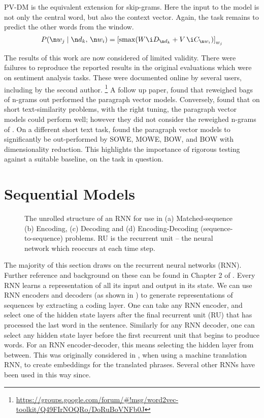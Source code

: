 {PV-DM is the equivalent extension for skip-grams.
Here the input to the model is not only the central word, but also the context vector.
Again, the task remains to predict the other words from the window.
\begin{equation}
P(\n w_j \mid \n d_k,\, \n w_{i}) = \left[ \softmax(W\i D_{\n d_k} + V\,\i C_{\n w_{i}}) \right]_{w_j} 
\end{equation}


The results of this work are now considered of limited validity.
There were failures to reproduce the reported results in the original evaluations
which were on sentiment analysis tasks.
These were documented online by several users, including by the second author.%
\footnote{ \url{https://groups.google.com/forum/\#!msg/word2vec-toolkit/Q49FIrNOQRo/DoRuBoVNFb0J}}
A follow up paper,  found that reweighed bags of n-grams  out performed the paragraph vector models.
Conversely, \textcite{lau2016doc2vecissues} found that on short text-similarity problems, with the right tuning, the paragraph vector models could perform well;
however they did not consider the reweighed n-grams of \parencite{wang2012baselines}.
On a different short text task, \textcite{White2015SentVecMeaning} found the paragraph vector models to significantly be out-performed by SOWE, MOWE, BOW, and BOW with dimensionality reduction.
This highlights the importance of rigorous testing against a suitable baseline, on the task in question.


\section{Sequential Models}

\begin{figure}
	\caption{The unrolled structure of an RNN for use in (a) Matched-sequence (b) Encoding, (c) Decoding and (d) Encoding-Decoding (sequence-to-sequence) problems. RU is the recurrent unit -- the neural network which reoccurs at each time step.
	}
	\label{fig-rnns-sq}
	
	\resizebox{\textwidth}{!}{}
\end{figure}

The majority of this section draws on the recurrent neural networks (RNN).
Further reference and background on these can be found in Chapter 2 of .
Every RNN learns a representation of all its input and output in its state.
We can use RNN encoders and decoders (as shown in ) to generate representations of sequences by extracting a coding layer.
One can take any RNN encoder,
and select one of the hidden state layers after the final recurrent unit (RU) that has processed the last word in the sentence.
Similarly for any RNN decoder, one can select any hidden state layer before the first recurrent unit that begins to produce words.
For an RNN encoder-decoder, this means selecting the hidden layer from between.
This was originally considered in , when using a machine translation RNN, to create embeddings for the translated phrases.
Several other RNNs have been used in this way since.



}
